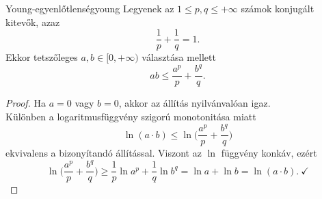 \documentclass[
]{elteikthesis}[2024/04/26]
\begin{document}
	\begin{lemma}{Young-egyenlőtlenség}{young}
		Legyenek az \( 1 \leq p, q \leq +\infty \) számok konjugált kitevők, azaz
		\[
			\frac{1}{p} + \frac{1}{q} = 1.
		\]
		Ekkor tetszőleges \( a, b \in [0, +\infty) \) választása mellett
		\[
			ab \leq \frac{a^p}{p} + \frac{b^q}{q}.
		\]
	\end{lemma}
	\begin{proof}
		Ha \( a = 0 \) vagy \( b = 0 \), akkor az állítás nyilvánvalóan igaz.\\[6pt]
		Különben a logaritmusfüggvény szigorú monotonitása miatt
		\[
			\ln( a \cdot b ) \leq
			\ln \biggl( \frac{a^p}{p} + \frac{b^q}{q} \biggr)
		\]
		ekvivalens a bizonyítandó állítással.
		Viszont az \( \ln \) függvény konkáv, ezért
		\[
		\ln \biggl( \frac{a^p}{p} + \frac{b^q}{q} \biggr) \geq
		\frac{1}{p} \ln a^p + \frac{1}{q} \ln b^q =
		\ln a + \ln b =
		\ln( a \cdot b ). \ \checkmark
		\]
	\end{proof}
	
\end{document}
